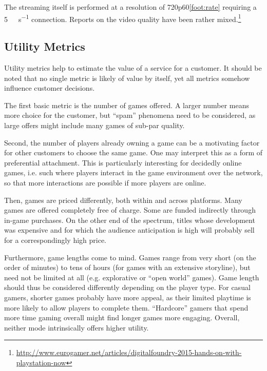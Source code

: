 
The streaming itself is performed at a resolution of
720p60\cref{foot:rate} requiring a \SI{5}{\mega\bit\per\second}
connection. Reports on the video quality have been rather
mixed.\footnote{\url{http://www.eurogamer.net/articles/digitalfoundry-2015-hands-on-with-playstation-now}}






\subsection{Utility Metrics}

Utility metrics help to estimate the value of a service for a customer.
It should be noted that no single metric is likely of value by itself,
yet all metrics somehow influence customer decisions.

The first basic metric is the number of games offered. A larger number
means more choice for the customer, but ``spam'' phenomena need to
be considered, as large offers might include many games of sub-par quality.

Second, the number of players already owning a game can be a
motivating factor for other customers to choose the same game.
One may interpret this as a form of preferential attachment.
This is particularly interesting for decidedly online games, i.e.
such where players interact in the game environment over the network,
so that more interactions are possible if more players are online.

Then, games are priced differently, both within and across
platforms. Many games are offered completely free of charge.
Some are funded indirectly through in-game purchases. On the
other end of the spectrum, titles whose development was expensive
and for which the audience anticipation is high will probably sell
for a correspondingly high price.

Furthermore, game lengths come to mind. Games range from very short
(on the order
of minutes) to tens of hours (for games with an extensive storyline),
but need not be limited at all (e.g. explorative or ``open world'' games).
Game length should thus be considered differently depending on
the player type. For casual gamers, shorter games probably have
more appeal, as their limited playtime is more likely to allow
players to complete them. ``Hardcore'' gamers that spend more
time gaming overall might find longer games more engaging.
Overall, neither mode intrinsically offers higher utility.

